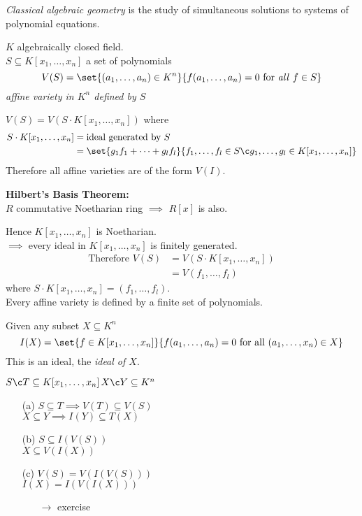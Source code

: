 %
\emph{Classical algebraic geometry} is the study of simultaneous solutions to systems of polynomial equations.

$K$ algebraically closed field. \\
$S\subseteq K[x_1,\dotsc,x_n]$ a set of polynomials
\[ V(S) = \set{(a_1,\dotsc,a_n)\in K^n}{f(a_1,\dotsc,a_n)=0\text{ for \emph{all} }f\in S} \]
\emph{affine variety in $K^n$ defined by $S$}

\note $V(S)=V(S\cdot K[x_1,\dotsc,x_n])$ where
\begin{align*}
S\cdot K[x_1,\dotsc,x_n] &= \text{ideal generated by $S$} \\
&= \set{g_1f_1+\dotsb+g_lf_l}{f_1,\dotsc,f_l\in S\c g_1,\dotsc,g_l\in K[x_1,\dotsc,x_n]}
\end{align*}
Therefore all affine varieties are of the form $V(I)$.

\textbf{Hilbert's Basis Theorem:} \\
$R$ commutative Noetharian ring $\implies$ $R[x]$ is also.

Hence $K[x_1,\dotsc,x_n]$ is Noetharian. \\
$\implies$ every ideal in $K[x_1,\dotsc,x_n]$ is finitely generated. \\
\begin{align*}
\text{Therefore } V(S) &= V(S\cdot K[x_1,\dotsc,x_n]) \\
&= V(f_1,\dotsc,f_l)
\end{align*}
where $S\cdot K[x_1,\dotsc,x_n]=(f_1,\dotsc,f_l)$. \\
Every affine variety is defined by a finite set of polynomials.

 Given any subset $X\subseteq K^n$
\[ I(X) = \set{f\in K[x_1,\dotsc,x_n]}{f(a_1,\dotsc,a_n)=0\text{ for all }(a_1,\dotsc,x_n)\in X} \]
This is an ideal, the \emph{ideal of $X$}.

\remarks $S\c T\subseteq K[x_1,\dotsc,x_n]$\quad $X\c Y\subseteq K^n$
\begin{enumerate}
\item[(a)] $S\subseteq T\implies V(T)\subseteq V(S)$ \\
$X\subseteq Y \implies I(Y)\subseteq T(X)$
\item[(b)] $S\subseteq I(V(S))$ \\
$X\subseteq V(I(X))$
\item[(c)] $V(S)=V(I(V(S)))$ \\
$I(X)=I(V(I(X)))$
\begin{itemize}
\item[$\to$] exercise
\end{itemize}
\end{enumerate}

